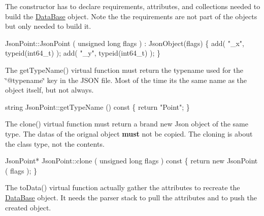 The constructor has to declare requirements, attributes, and collections needed to build the \mbox{\hyperlink{classHurricane_1_1DataBase}{Data\+Base}} object. Note the the requirements are not part of the objects but only needed to build it.


\begin{DoxyCode}
JsonPoint::JsonPoint ( \textcolor{keywordtype}{unsigned} \textcolor{keywordtype}{long} flags )
  : JsonObject(flags)
\{
  add( \textcolor{stringliteral}{"\_x"}, \textcolor{keyword}{typeid}(int64\_t) );
  add( \textcolor{stringliteral}{"\_y"}, \textcolor{keyword}{typeid}(int64\_t) );
\}
\end{DoxyCode}


The {\ttfamily get\+Type\+Name()} virtual function must return the typename used for the {\ttfamily \char`\"{}@typename\char`\"{}} key in the J\+S\+ON file. Most of the time it\textquotesingle{}s the same name as the object itself, but not always.


\begin{DoxyCode}
\textcolor{keywordtype}{string} JsonPoint::getTypeName ()\textcolor{keyword}{ const}
\textcolor{keyword}{}\{ \textcolor{keywordflow}{return} \textcolor{stringliteral}{"Point"}; \}
\end{DoxyCode}


The {\ttfamily clone()} virtual function must return a brand new Json object of the same type. The datas of the orignal object {\bfseries must} not be copied. The cloning is about the class type, not the contents.


\begin{DoxyCode}
JsonPoint* JsonPoint::clone ( \textcolor{keywordtype}{unsigned} \textcolor{keywordtype}{long} flags )\textcolor{keyword}{ const}
\textcolor{keyword}{}\{ \textcolor{keywordflow}{return} \textcolor{keyword}{new} JsonPoint ( flags ); \}
\end{DoxyCode}


The {\ttfamily to\+Data()} virtual function actually gather the attributes to recreate the \mbox{\hyperlink{classHurricane_1_1DataBase}{Data\+Base}} object. It needs the parser stack to pull the attributes and to push the created object.


